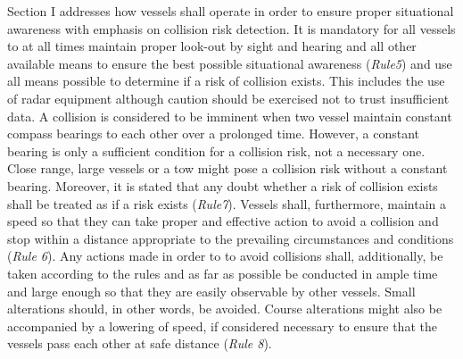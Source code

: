 Section I addresses how vessels shall operate in order to ensure proper situational awareness with emphasis on collision risk detection.  It is mandatory for  all vessels to at all times maintain proper look-out by sight and hearing and all other available means to ensure the best possible situational awareness (\textit{Rule5}) and use all means possible to determine if a risk of collision exists. This includes the use of radar equipment although caution should be exercised not to trust insufficient data. A collision is considered to be imminent when two vessel maintain constant compass bearings to each other over a prolonged time.
However, a constant bearing is only a sufficient condition for a collision risk, not a necessary one. Close range, large vessels or a tow might pose a collision risk without a constant bearing. Moreover, it is stated that any doubt whether a risk of collision exists shall be treated as if a risk exists (\textit{Rule7}).
Vessels shall, furthermore, maintain a speed so that they can take proper and effective action to avoid a collision and stop within a distance appropriate to the prevailing circumstances and conditions (\textit{Rule 6}). Any actions made in order to to avoid collisions shall, additionally, be taken according to the rules and as far as possible be conducted in ample time and large enough so that they are easily observable by other vessels. Small alterations should, in other words, be avoided. Course alterations might also be accompanied by a lowering of speed, if considered necessary to ensure that the vessels pass each other at safe distance (\textit{Rule 8}).

